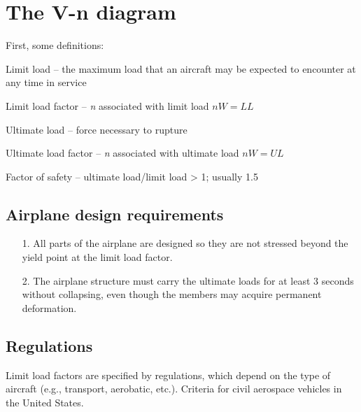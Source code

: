 \documentclass{AeroStructure-ERJohnson}
\begin{document}
\section{The V-n diagram}\label{sec2.4}

First, some definitions:
\begin{unlist}
\item[Limit load] -- the maximum load that an aircraft may be expected to encounter at any time in service

\item[Limit load factor] -- \textit{n} associated with limit load $n W=L L$

\item[Ultimate load] -- force necessary to rupture

\item[Ultimate load factor] -- \textit{n} associated with ultimate load $n W=U L$

\item[Factor of safety] -- ultimate load/limit load > 1; usually 1.5
\end{unlist}

\subsection{Airplane design requirements}\label{sec2.4.1}
\vspace*{12pt}
\begin{framed}
\begin{enumerate}
\vspace*{-12pt}
\item[1.] All parts of the airplane are designed so they are not stressed beyond the yield point at the limit load factor.

\item[2.] The airplane structure must carry the ultimate loads for at least 3 seconds without collapsing, even though the members may acquire permanent deformation.
\end{enumerate}
\vspace*{-1\topsep}%
\end{framed}

\subsection{Regulations}\label{sec2.4.2}

Limit load factors are specified by regulations, which depend on the type of aircraft (e.g., transport, aerobatic, etc.). Criteria for civil aerospace vehicles in the United States.
\end{document}
